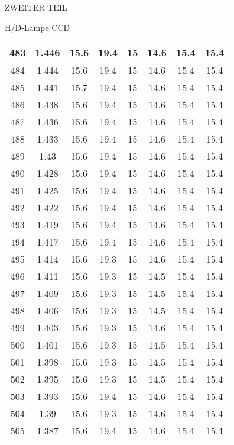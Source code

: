 \begin{appendix}
\begin{chapter}{ZWEITER TEIL}
\begin{section}{H/D-Lampe CCD}
\begin{scriptsize}
\begin{longtable}[htbp]{|c|c|c|c|c|c|c|c|}
            483 & 1.446 & 15.6 & 19.4 & 15 & 14.6 & 15.4 & 15.4 \\ \hline
            484 & 1.444 & 15.6 & 19.4 & 15 & 14.6 & 15.4 & 15.4 \\ \hline
            485 & 1.441 & 15.7 & 19.4 & 15 & 14.6 & 15.4 & 15.4 \\ \hline
            486 & 1.438 & 15.6 & 19.4 & 15 & 14.6 & 15.4 & 15.4 \\ \hline
            487 & 1.436 & 15.6 & 19.4 & 15 & 14.6 & 15.4 & 15.4 \\ \hline
            488 & 1.433 & 15.6 & 19.4 & 15 & 14.6 & 15.4 & 15.4 \\ \hline
            489 & 1.43 & 15.6 & 19.4 & 15 & 14.6 & 15.4 & 15.4 \\ \hline
            490 & 1.428 & 15.6 & 19.4 & 15 & 14.6 & 15.4 & 15.4 \\ \hline
            491 & 1.425 & 15.6 & 19.4 & 15 & 14.6 & 15.4 & 15.4 \\ \hline
            492 & 1.422 & 15.6 & 19.4 & 15 & 14.6 & 15.4 & 15.4 \\ \hline
            493 & 1.419 & 15.6 & 19.4 & 15 & 14.6 & 15.4 & 15.4 \\ \hline
            494 & 1.417 & 15.6 & 19.4 & 15 & 14.6 & 15.4 & 15.4 \\ \hline
            495 & 1.414 & 15.6 & 19.3 & 15 & 14.6 & 15.4 & 15.4 \\ \hline
            496 & 1.411 & 15.6 & 19.3 & 15 & 14.5 & 15.4 & 15.4 \\ \hline
            497 & 1.409 & 15.6 & 19.3 & 15 & 14.5 & 15.4 & 15.4 \\ \hline
            498 & 1.406 & 15.6 & 19.3 & 15 & 14.5 & 15.4 & 15.4 \\ \hline
            499 & 1.403 & 15.6 & 19.3 & 15 & 14.6 & 15.4 & 15.4 \\ \hline
            500 & 1.401 & 15.6 & 19.3 & 15 & 14.5 & 15.4 & 15.4 \\ \hline
            501 & 1.398 & 15.6 & 19.3 & 15 & 14.5 & 15.4 & 15.4 \\ \hline
            502 & 1.395 & 15.6 & 19.3 & 15 & 14.5 & 15.4 & 15.4 \\ \hline
            503 & 1.393 & 15.6 & 19.4 & 15 & 14.6 & 15.4 & 15.4 \\ \hline
            504 & 1.39 & 15.6 & 19.3 & 15 & 14.6 & 15.4 & 15.4 \\ \hline
            505 & 1.387 & 15.6 & 19.4 & 15 & 14.6 & 15.4 & 15.4 \\ \hline

\end{longtable}
\end{scriptsize}
\end{section}
\end{chapter}
\end{appendix}
